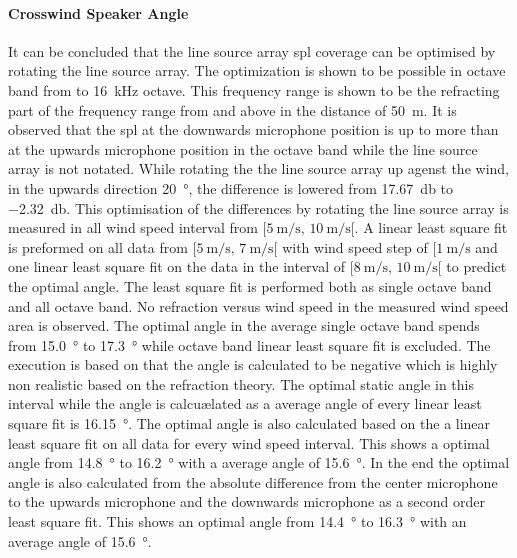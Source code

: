 \paragraph{Crosswind Speaker Angle}
It can be concluded that the line source array \gls{spl} coverage can be optimised by rotating the line source array. The optimization is shown to be possible in octave band from  to \SI{16}{\kilo\hertz} octave. This frequency range is shown to be the refracting part of the frequency range from  and above in the distance of \SI{50}{\meter}. It is observed that the \gls{spl} at the downwards microphone position is up to  more than at the upwards microphone position in the  octave band while the line source array is not notated. While rotating the the line source array up agenst the wind, in the upwards direction \SI{20}{\degree}, the difference is lowered from \SI{17.67}{\decibel} to \SI{-2.32}{\decibel}. This optimisation of the differences by rotating the line source array is measured in all wind speed interval from $[\SI{5}{\meter\per\second},\, \SI{10}{\meter\per\second}[ $. A linear least square fit is preformed on all data from $[\SI{5}{\meter\per\second},\, \SI{7}{\meter\per\second}[ $ with wind speed step of $[\SI{1}{\meter\per\second}$ and one linear least square fit on the data in the interval of $[\SI{8}{\meter\per\second},\, \SI{10}{\meter\per\second}[ $ to predict the optimal angle. The least square fit is performed both as single octave band and all octave band. No refraction versus wind speed in the measured wind speed area is observed. The optimal angle in the average single octave band spends from \SI{15.0}{\degree} to \SI{17.3}{\degree} while  octave band linear least square fit is excluded. The execution is based on that the angle is calculated to be negative which is highly non realistic based on the refraction theory. The optimal static angle in this interval while the angle is calcuælated as a average angle of every linear least square fit is \SI{16.15}{\degree}. The optimal angle is also calculated based on the a linear least square fit on all data for every wind speed interval. This shows a optimal angle from \SI{14.8}{\degree} to \SI{16.2}{\degree} with a average angle of \SI{15.6}{\degree}. In the end the optimal angle is also calculated from the absolute difference from the center microphone to the upwards microphone and the downwards microphone as a second order least square fit. This shows an optimal angle from \SI{14.4}{\degree} to \SI{16.3}{\degree} with an average angle of \SI{15.6}{\degree}. 




